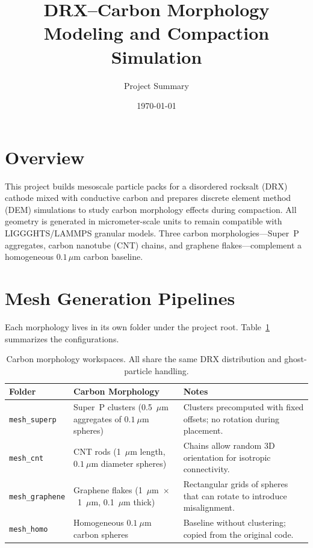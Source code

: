 \documentclass[11pt]{article}
\title{DRX--Carbon Morphology Modeling and Compaction Simulation}
\author{Project Summary}
\date{\today}
\begin{document}
\maketitle

\section{Overview}
This project builds mesoscale particle packs for a disordered rocksalt (DRX) cathode mixed with conductive carbon and prepares discrete element method (DEM) simulations to study carbon morphology effects during compaction. All geometry is generated in micrometer-scale units to remain compatible with LIGGGHTS/LAMMPS granular models. Three carbon morphologies---Super~P aggregates, carbon nanotube (CNT) chains, and graphene flakes---complement a homogeneous $0.1\,\mu$m carbon baseline.

\section{Mesh Generation Pipelines}
Each morphology lives in its own folder under the project root. Table~\ref{tab:morph} summarizes the configurations.

\begin{table}[h]
    \centering
    \begin{tabular}{|>{\raggedright}p{3cm}|p{4cm}|p{5cm}|}
        \hline
        \textbf{Folder} & \textbf{Carbon Morphology} & \textbf{Notes} \\
        \hline
        \texttt{mesh\_superp} & Super~P clusters (0.5~$\mu$m aggregates of $0.1~\mu$m spheres) & Clusters precomputed with fixed offsets; no rotation during placement. \\
        \texttt{mesh\_cnt} & CNT rods (1~$\mu$m length, $0.1~\mu$m diameter spheres) & Chains allow random 3D orientation for isotropic connectivity. \\
        \texttt{mesh\_graphene} & Graphene flakes (1~$\mu$m~$\times$~1~$\mu$m, 0.1~$\mu$m thick) & Rectangular grids of spheres that can rotate to introduce misalignment. \\
        \texttt{mesh\_homo} & Homogeneous $0.1~\mu$m carbon spheres & Baseline without clustering; copied from the original code. \\
        \hline
    \end{tabular}
    \caption{Carbon morphology workspaces. All share the same DRX distribution and ghost-particle handling.}
    \label{tab:morph}
\end{table}
\end{document}
